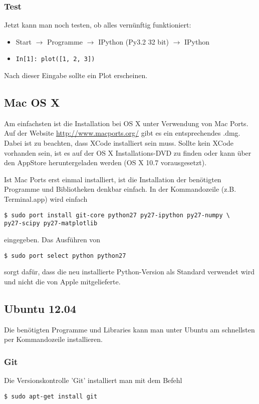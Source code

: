 \subsubsection{Test}
Jetzt kann man noch testen, ob alles vernünftig funktioniert:
\begin{itemize}
  \item Start $\rightarrow$ Programme $\rightarrow$ IPython (Py3.2 32 bit) $\rightarrow$ IPython
  \item \texttt{In[1]: plot([1, 2, 3])}
\end{itemize}
Nach dieser Eingabe sollte ein Plot erscheinen.

\subsection{Mac OS X}
Am einfachsten ist die Installation bei OS X unter Verwendung von Mac Ports.
Auf der Website \url{http://www.macports.org/} gibt es ein entsprechendes .dmg.
Dabei ist zu beachten, dass XCode installiert sein muss. Sollte kein XCode vorhanden sein, ist es auf der OS X Installations-DVD zu finden oder kann über den AppStore heruntergeladen werden (OS X 10.7 vorausgesetzt).

Ist Mac Ports erst einmal installiert, ist die Installation der benötigten Programme und Bibliotheken denkbar einfach. In der Kommandozeile (z.B. Terminal.app) wird einfach
\begin{verbatim}
$ sudo port install git-core python27 py27-ipython py27-numpy \
py27-scipy py27-matplotlib
\end{verbatim}
eingegeben.
Das Ausführen von
\begin{verbatim}
$ sudo port select python python27
\end{verbatim}
sorgt dafür, dass die neu installierte Python-Version als Standard verwendet wird und nicht die von Apple mitgelieferte.

\subsection{Ubuntu 12.04}
Die benötigten Programme und Libraries kann man unter Ubuntu am schnellsten per Kommandozeile installieren.

\subsubsection{Git}
Die Versionskontrolle 'Git' installiert man mit dem Befehl
\begin{verbatim}
$ sudo apt-get install git
\end{verbatim}

